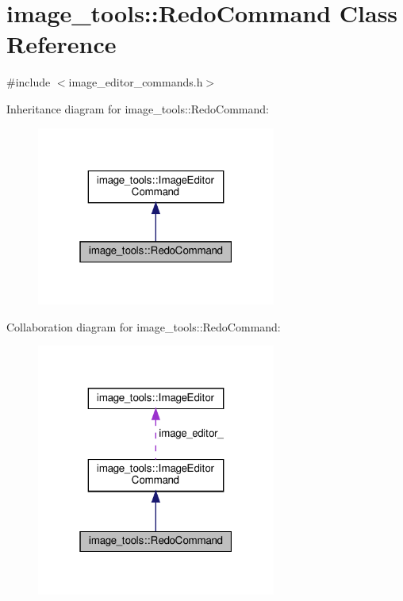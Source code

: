 \hypertarget{classimage__tools_1_1RedoCommand}{}\section{image\+\_\+tools\+:\+:Redo\+Command Class Reference}
\label{classimage__tools_1_1RedoCommand}


{\ttfamily \#include $<$image\+\_\+editor\+\_\+commands.\+h$>$}



Inheritance diagram for image\+\_\+tools\+:\+:Redo\+Command\+:
\nopagebreak
\begin{figure}[H]
\begin{center}
\leavevmode
\includegraphics[width=223pt]{classimage__tools_1_1RedoCommand__inherit__graph}
\end{center}
\end{figure}


Collaboration diagram for image\+\_\+tools\+:\+:Redo\+Command\+:
\nopagebreak
\begin{figure}[H]
\begin{center}
\leavevmode
\includegraphics[width=223pt]{classimage__tools_1_1RedoCommand__coll__graph}
\end{center}
\end{figure}
